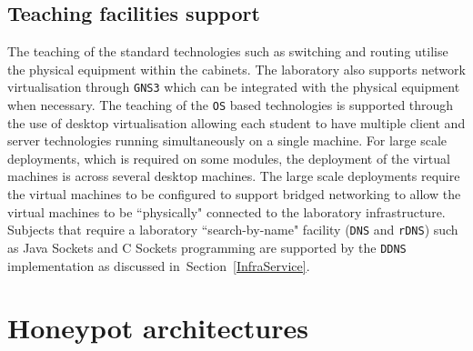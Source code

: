 \subsection{Teaching facilities support}
The teaching of the standard technologies such as switching and routing utilise the physical equipment within the cabinets. The laboratory also supports network virtualisation through \texttt{GNS3} which can be integrated with the physical equipment when necessary. The teaching of the \texttt{OS} based technologies is supported through the use of desktop virtualisation allowing each student to have multiple client and server technologies running simultaneously on a single machine. For large scale deployments, which is required on some modules, the deployment of the virtual machines is across several desktop machines. The large scale deployments require the virtual machines to be configured to support bridged networking to allow the virtual machines to be ``physically" connected to the laboratory infrastructure. Subjects that require a laboratory ``search-by-name" facility (\texttt{DNS} and \texttt{rDNS}) such as Java Sockets and C Sockets programming are supported by the \texttt{DDNS} implementation as discussed in~Section~\ref{InfraService}.

\section{Honeypot architectures}

